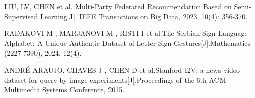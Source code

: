 \begin{thebibliography}{200}
	LIU, LV, CHEN et al. Multi-Party Federated Recommendation Based on Semi-Supervised Learning[J]. IEEE Transactions on Big Data, 2023, 10(4): 356-370.

	RADAKOVI M , MARJANOVI M , RISTI I et al.The Serbian Sign Language Alphabet: A Unique Authentic Dataset of Letter Sign Gestures[J].Mathematics (2227-7390), 2024, 12(4).

	ANDRÉ ARAUJO, CHAVES J , CHEN D et al.Stanford I2V: a news video dataset for query-by-image experiments[J].Proceedings of the 6th ACM Multimedia Systems Conference, 2015.











\end{thebibliography}
\clearpage


